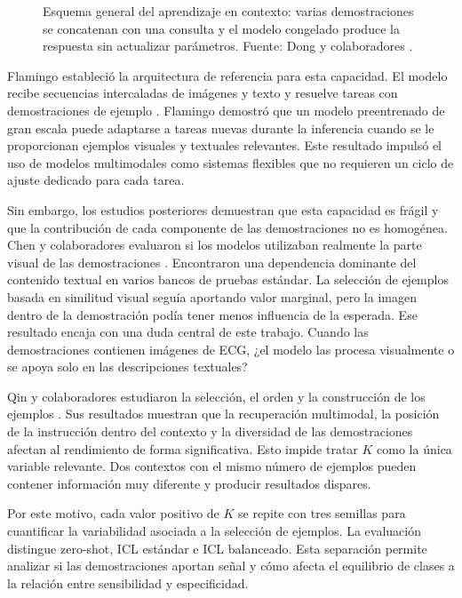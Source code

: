 \begin{figure}[H]
  \centering
  \caption{Esquema general del aprendizaje en contexto: varias demostraciones se concatenan con una consulta y el modelo congelado produce la respuesta sin actualizar parámetros. Fuente: Dong y colaboradores \cite{dong2024survey}.}
  \label{fig:icl_context_related_work}
\end{figure}

Flamingo estableció la arquitectura de referencia para esta capacidad. El modelo recibe secuencias intercaladas de imágenes y texto y resuelve tareas con demostraciones de ejemplo \cite{alayrac2022}. Flamingo demostró que un modelo preentrenado de gran escala puede adaptarse a tareas nuevas durante la inferencia cuando se le proporcionan ejemplos visuales y textuales relevantes. Este resultado impulsó el uso de modelos multimodales como sistemas flexibles que no requieren un ciclo de ajuste dedicado para cada tarea.

Sin embargo, los estudios posteriores demuestran que esta capacidad es frágil y que la contribución de cada componente de las demostraciones no es homogénea. Chen y colaboradores evaluaron si los modelos utilizaban realmente la parte visual de las demostraciones \cite{chen2024}. Encontraron una dependencia dominante del contenido textual en varios bancos de pruebas estándar. La selección de ejemplos basada en similitud visual seguía aportando valor marginal, pero la imagen dentro de la demostración podía tener menos influencia de la esperada. Ese resultado encaja con una duda central de este trabajo. Cuando las demostraciones contienen imágenes de ECG, ¿el modelo las procesa visualmente o se apoya solo en las descripciones textuales?

Qin y colaboradores estudiaron la selección, el orden y la construcción de los ejemplos \cite{zhang2024mmicl}. Sus resultados muestran que la recuperación multimodal, la posición de la instrucción dentro del contexto y la diversidad de las demostraciones afectan al rendimiento de forma significativa. Esto impide tratar \(K\) como la única variable relevante. Dos contextos con el mismo número de ejemplos pueden contener información muy diferente y producir resultados dispares.

Por este motivo, cada valor positivo de \(K\) se repite con tres semillas para cuantificar la variabilidad asociada a la selección de ejemplos. La evaluación distingue zero-shot, ICL estándar e ICL balanceado. Esta separación permite analizar si las demostraciones aportan señal y cómo afecta el equilibrio de clases a la relación entre sensibilidad y especificidad.

